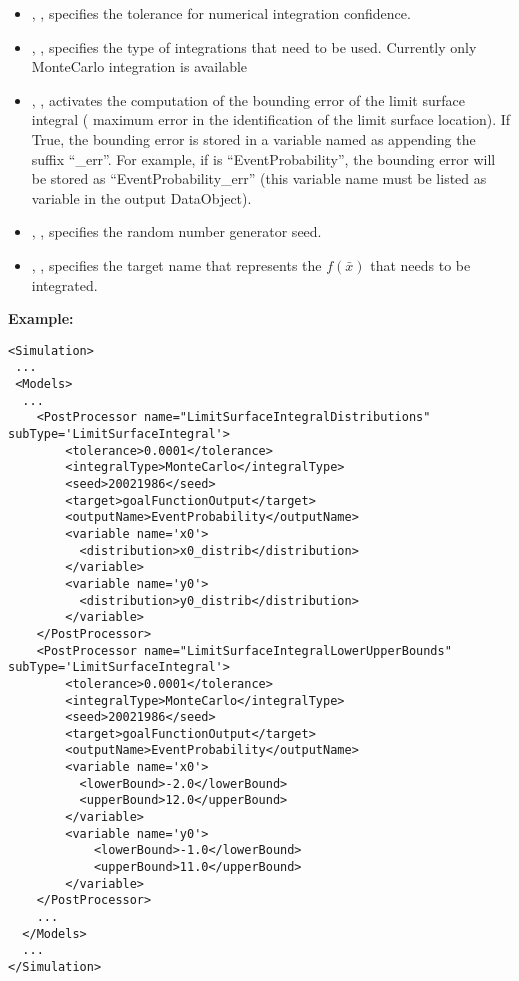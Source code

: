 \begin{itemize}
    \item  {}, , specifies the tolerance for
               numerical integration confidence.
     \item  {}, , specifies the type of integrations that
                need to be used. Currently only MonteCarlo integration is available
    \item  {}, , 
    activates the computation of the bounding error of the limit 
    surface integral ( maximum error in the identification of the 
    limit surface location). If True, the bounding error is stored 
    in a variable named as  appending the suffix
    ``\_err''. For example, if  is 
    ``EventProbability'', the bounding error will be stored as 
    ``EventProbability\_err'' (this variable name must be listed as 
    variable in the output DataObject).
     \item  {}, , specifies the random number generator seed.
     \item  {}, , specifies the target name that represents
                the $f\left ( \bar{x} \right )$ that needs to be integrated.
\end{itemize}

\textbf{Example:}
\begin{lstlisting}[style=XML,morekeywords={name,subType,debug,class,type}]
<Simulation>
 ...
 <Models>
  ...
    <PostProcessor name="LimitSurfaceIntegralDistributions" subType='LimitSurfaceIntegral'>
        <tolerance>0.0001</tolerance>
        <integralType>MonteCarlo</integralType>
        <seed>20021986</seed>
        <target>goalFunctionOutput</target>
        <outputName>EventProbability</outputName>
        <variable name='x0'>
          <distribution>x0_distrib</distribution>
        </variable>
        <variable name='y0'>
          <distribution>y0_distrib</distribution>
        </variable>
    </PostProcessor>
    <PostProcessor name="LimitSurfaceIntegralLowerUpperBounds" subType='LimitSurfaceIntegral'>
        <tolerance>0.0001</tolerance>
        <integralType>MonteCarlo</integralType>
        <seed>20021986</seed>
        <target>goalFunctionOutput</target>
        <outputName>EventProbability</outputName>
        <variable name='x0'>
          <lowerBound>-2.0</lowerBound>
          <upperBound>12.0</upperBound>
        </variable>
        <variable name='y0'>
            <lowerBound>-1.0</lowerBound>
            <upperBound>11.0</upperBound>
        </variable>
    </PostProcessor>
    ...
  </Models>
  ...
</Simulation>
\end{lstlisting}



